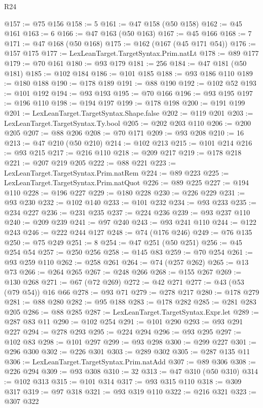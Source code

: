 \begin{lexlean}{R24}
\begin{coremodule}
@157 := @75 @156
@158 := 5
@161 := @47 @158 (@50 @158)
@162 := @45 @161
@163 := 6
@166 := @47 @163 (@50 @163)
@167 := @45 @166
@168 := 7
@171 := @47 @168 (@50 @168)
@175 := @162 (@167 (@45 @171 @54))
@176 := @157 @175
@177 := LexLeanTarget.TargetSyntax.Prim.natLt
@178 := @89 @177
@179 := @70 @161
@180 := @93 @179
@181 := 256
@184 := @47 @181 (@50 @181)
@185 := @102 @184
@186 := @101 @185
@188 := @93 @186 @110
@189 := @180 @188
@190 := @178 @189
@191 := @88 @190
@192 := @102 @52
@193 := @101 @192
@194 := @93 @193
@195 := @70 @166
@196 := @93 @195
@197 := @196 @110
@198 := @194 @197
@199 := @178 @198
@200 := @191 @199
@201 := LexLeanTarget.TargetSyntax.Shape.false
@202 := @119 @201
@203 := LexLeanTarget.TargetSyntax.Ty.bool
@205 := @202 @203 @110
@206 := @200 @205
@207 := @88 @206
@208 := @70 @171
@209 := @93 @208
@210 := 16
@213 := @47 @210 (@50 @210)
@214 := @102 @213
@215 := @101 @214
@216 := @93 @215
@217 := @216 @110
@218 := @209 @217
@219 := @178 @218
@221 := @207 @219 @205
@222 := @88 @221
@223 := LexLeanTarget.TargetSyntax.Prim.natRem
@224 := @89 @223
@225 := LexLeanTarget.TargetSyntax.Prim.natQuot
@226 := @89 @225
@227 := @194 @110
@228 := @196 @227
@229 := @180 @228
@230 := @226 @229
@231 := @93 @230
@232 := @102 @140
@233 := @101 @232
@234 := @93 @233
@235 := @234 @227
@236 := @231 @235
@237 := @224 @236
@239 := @93 @237 @110
@240 := @209 @239
@241 := @97 @240
@243 := @93 @241 @110
@244 := @122 @243
@246 := @222 @244 @127
@248 := @74 (@176 @246)
@249 := @76 @135
@250 := @75 @249
@251 := 8
@254 := @47 @251 (@50 @251)
@256 := @45 @254 @54
@257 := @250 @256
@258 := @145 @83
@259 := @70 @254
@261 := @93 @259 @110
@262 := @258 @261
@264 := @74 (@257 @262)
@265 := @13 @73
@266 := @264 @265
@267 := @248 @266
@268 := @155 @267
@269 := @130 @268
@271 := @67 (@72 @269)
@272 := @42 @271
@277 := @43 (@53 (@79 @54)) @16 @66
@278 := @93 @71
@279 := @278 @217
@280 := @178 @279
@281 := @88 @280
@282 := @95 @188
@283 := @178 @282
@285 := @281 @283 @205
@286 := @88 @285
@287 := LexLeanTarget.TargetSyntax.Expr.let
@289 := @287 @83 @11
@290 := @102 @254
@291 := @101 @290
@293 := @93 @291 @227
@294 := @278 @293
@295 := @224 @294
@296 := @93 @295
@297 := @102 @83
@298 := @101 @297
@299 := @93 @298
@300 := @299 @227
@301 := @296 @300
@302 := @226 @301
@303 := @289 @302
@305 := @287 @135 @11
@306 := LexLeanTarget.TargetSyntax.Prim.natAdd
@307 := @89 @306
@308 := @226 @294
@309 := @93 @308
@310 := 32
@313 := @47 @310 (@50 @310)
@314 := @102 @313
@315 := @101 @314
@317 := @93 @315 @110
@318 := @309 @317
@319 := @97 @318
@321 := @93 @319 @110
@322 := @216 @321
@323 := @307 @322

\end{coremodule}
\end{lexlean}
